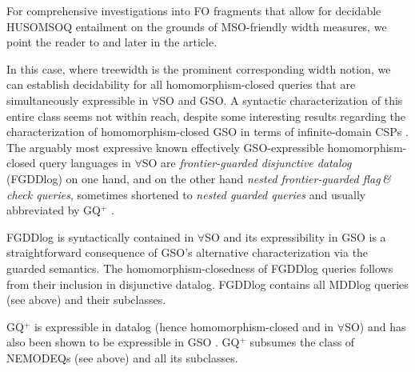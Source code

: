 \documentclass[10pt,a4paper]{amsart}
\theoremstyle{definition}
\numberwithin{equation}{section}
\theoremstyle{plain}
\theoremstyle{definition}
\theoremstyle{myexample}
\theoremstyle{plain}
\theoremstyle{definition}
\begin{document}
For comprehensive investigations into FO fragments that allow for decidable HUSOMSOQ entailment on the grounds of MSO-friendly width measures, we point the reader to  and  later in the article.

\medskip {}
In this case, where treewidth is the prominent corresponding width notion, we can establish decidability for all homomorphism-closed queries that are simultaneously expressible in $\forall$SO and GSO. A syntactic characterization of this entire class seems not within reach, despite
some interesting results regarding the characterization of homomorphism-closed GSO in terms of infinite-domain CSPs \cite[Cor. 21]{abs-2010-05677}.   
The arguably most expressive known effectively GSO-expressible homomorphism-closed query languages in $\forall$SO are \emph{frontier-guarded disjunctive datalog} (FGDDlog) on one hand, and on the other hand \emph{nested frontier-guarded flag\,\&\,check queries}, sometimes shortened to \emph{nested guarded queries} and usually abbreviated by GQ$^+$ \cite{BourhisKR15}. 

FGDDlog is syntactically contained in $\forall$SO and its expressibility in GSO is a straightforward consequence of GSO's alternative characterization via the guarded semantics. The homomorphism-closedness of FGDDlog queries follows from their inclusion in disjunctive datalog.
FGDDlog contains all MDDlog queries (see above) and their subclasses. 

GQ$^+$ is expressible in datalog (hence homomorphism-closed and in $\forall$SO) \cite{BourhisKR15} and has also been shown to be expressible in GSO \cite[Prop. 47]{abs-2010-05677}. GQ$^+$ subsumes the class of NEMODEQs (see above) and all its subclasses.    
\end{document}
